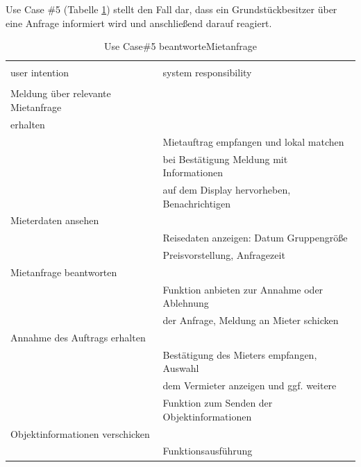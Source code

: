 \newpage
Use Case \#5 (Tabelle \ref{tab:mietanfrageUC}) stellt den Fall dar, dass ein Grundstückbesitzer über eine Anfrage informiert wird und anschließend darauf reagiert.
\begin{table}[H]
\caption{Use Case\#5 beantworteMietanfrage }
\centering
\begin{tabular}{l l}
\\ [-0.5ex]

\hline\hline
\\ [-0.5ex]
user intention & system responsibility
\\ [1.5ex]
\hline
\\ [-0.5ex]
Meldung über relevante Mietanfrage  &                                   \\[1ex]
erhalten                             &                                   \\[1ex]
                                     & Mietauftrag empfangen und lokal matchen    \\[1ex]
                                    & bei Bestätigung Meldung mit Informationen     \\[1ex]
                                    & auf dem Display hervorheben, Benachrichtigen  \\[1ex]
Mieterdaten ansehen               &                                   \\[1ex]
                                  & Reisedaten anzeigen: Datum Gruppengröße    \\[1ex]
                                   & Preisvorstellung, Anfragezeit              \\[1ex]
Mietanfrage beantworten            &                                   \\[1ex] 
                                   & Funktion anbieten zur Annahme oder Ablehnung  \\[1ex]
                                   & der Anfrage, Meldung an Mieter schicken       \\[1ex]
Annahme des Auftrags erhalten      &                                   \\[1ex]
                                   & Bestätigung des Mieters empfangen, Auswahl \\[1ex]
                                   & dem Vermieter anzeigen und ggf. weitere       \\[1ex]
                                   & Funktion zum Senden der Objektinformationen   \\[1ex]
Objektinformationen verschicken     &                                   \\[1ex]
                  &      Funktionsausführung                             \\[1ex]



\hline
\end{tabular}
\label{tab:mietanfrageUC}
\end{table}


